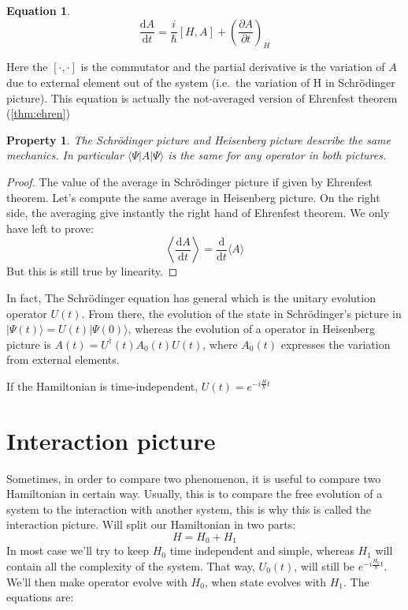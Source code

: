 \documentclass[10pt,a4paper]{report}
\theoremstyle{plain}
\newtheorem{prop}[thm]{Property}
\theoremstyle{definition}
\newtheorem{eqn}[thm]{Equation}
\theoremstyle{remark}
\newcommand{\ket}[1]{|#1\rangle}
\newcommand{\bra}[1]{\langle#1|}
\newcommand{\dd}{\mathrm{d}}
\newcommand{\der}[2]{\frac{\dd{#1}}{\dd{#2}}}
\newcommand{\dpar}[2]{\frac{\partial{#1}}{\partial{#2}}}
\begin{document}
\begin{eqn}
  \[\der At   = \frac i {\hbar}[H,A] + {\left(\dpar At \right)}_{\!\!H}\]
\end{eqn}

Here the $[\cdot,\cdot]$ is the commutator and the partial derivative is the
variation of $A$ due to external element out of the system (i.e.~the variation
of H in Schrödinger picture). This equation is actually the not-averaged version
of Ehrenfest theorem (\ref{thm:ehren})

\begin{prop}
  The Schrödinger picture and Heisenberg picture describe the same mechanics. In
  particular $\bra \Psi A \ket \Psi$ is the same for any operator in both pictures.
\end{prop}

\begin{proof}
  The value of the average in Schrödinger picture if given by Ehrenfest theorem.
  Let's compute the same average in Heisenberg picture. On the right side, the
  averaging give instantly the right hand of Ehrenfest theorem. We only have
  left to prove:
  \[ \left \langle \der A t\right\rangle = \der{}t\langle A\rangle\]
  But this is still true by linearity.
\end{proof}

In fact, The Schrödinger equation has general which is the unitary evolution
operator $U(t)$. From there, the evolution of the state in Schrödinger's picture
in $\ket {\Psi(t)} = U(t) \ket {\Psi(0)}$, whereas the evolution of a operator
in Heisenberg picture is $A(t) = U^\dagger(t)A_0(t)U(t)$, where $A_0(t)$
expresses the variation from external elements.

If the Hamiltonian is time-independent, $U(t) = e^{-i\frac H\hbar t}$

\section{Interaction picture}

Sometimes, in order to compare two phenomenon, it is useful to compare two
Hamiltonian in certain way. Usually, this is to compare the free evolution of a
system to the interaction with another system, this is why this is called the
interaction picture. Will split our Hamiltonian in two parts:
\[H = H_0 + H_1\]
In most case we'll try to keep $H_0$ time independent and simple, whereas $H_1$
will contain all the complexity of the system. That way, $U_0(t)$, will still be
$e^{-i\frac {H_0}\hbar t}$. We'll then make operator evolve with $H_0$, when
state evolves with $H_1$. The equations are:
\end{document}
